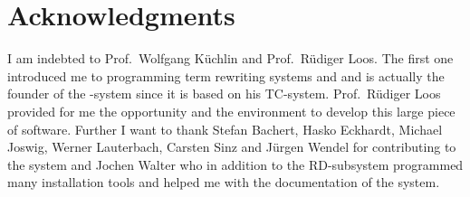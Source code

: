 \section{Acknowledgments}
I am indebted to Prof.\ Wolfgang K\"{u}chlin and Prof.\ R\"{u}diger Loos.
The first one introduced me to programming term rewriting systems and 
and is actually the founder of the \redux-system since it is based on
his TC-system.
Prof.\ R\"{u}diger Loos provided for me the opportunity and the environment to 
develop this large piece of software.
Further  I want to thank Stefan Bachert, Hasko Eckhardt, Michael Joswig,
Werner Lauterbach, Carsten Sinz and J\"{u}rgen Wendel for contributing
to the system and Jochen Walter who in addition to the RD-subsystem
programmed many installation tools and
helped me with the documentation of the system.
